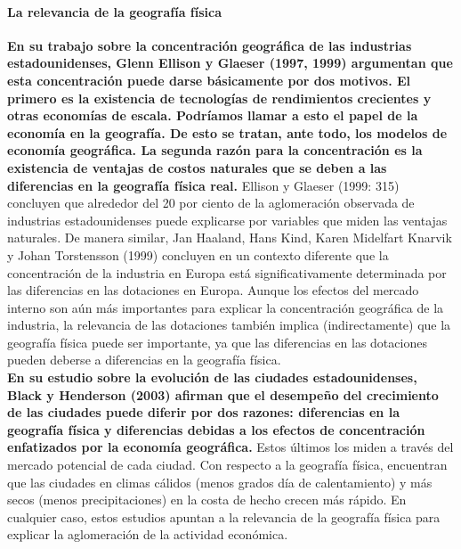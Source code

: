 \paragraph{La relevancia de la geografía física}
\textbf{En su trabajo sobre la concentración geográfica de las industrias estadounidenses, Glenn Ellison y Glaeser (1997, 1999) argumentan que esta concentración puede darse básicamente por dos motivos. El primero es la existencia de tecnologías de rendimientos crecientes y otras economías de escala. Podríamos llamar a esto el papel de la economía en la geografía. De esto se tratan, ante todo, los modelos de economía geográfica. La segunda razón para la concentración es la existencia de ventajas de costos naturales que se deben a las diferencias en la geografía física real.} Ellison y Glaeser (1999: 315) concluyen que alrededor del 20 por ciento de la aglomeración observada de industrias estadounidenses puede explicarse por variables que miden las ventajas naturales. De manera similar, Jan Haaland, Hans Kind, Karen Midelfart Knarvik y Johan Torstensson (1999) concluyen en un contexto diferente que la concentración de la industria en Europa está significativamente determinada por las diferencias en las dotaciones en Europa. Aunque los efectos del mercado interno son aún más importantes para explicar la concentración geográfica de la industria, la relevancia de las dotaciones también implica (indirectamente) que la geografía física puede ser importante, ya que las diferencias en las dotaciones pueden deberse a diferencias en la geografía física.\\
\textbf{En su estudio sobre la evolución de las ciudades estadounidenses, Black y Henderson (2003) afirman que el desempeño del crecimiento de las ciudades puede diferir por dos razones: diferencias en la geografía física y diferencias debidas a los efectos de concentración enfatizados por la economía geográfica.} Estos últimos los miden a través del mercado potencial de cada ciudad. Con respecto a la geografía física, encuentran que las ciudades en climas cálidos (menos grados día de calentamiento) y más secos (menos precipitaciones) en la costa de hecho crecen más rápido. En cualquier caso, estos estudios apuntan a la relevancia de la geografía física para explicar la aglomeración de la actividad económica. \\
